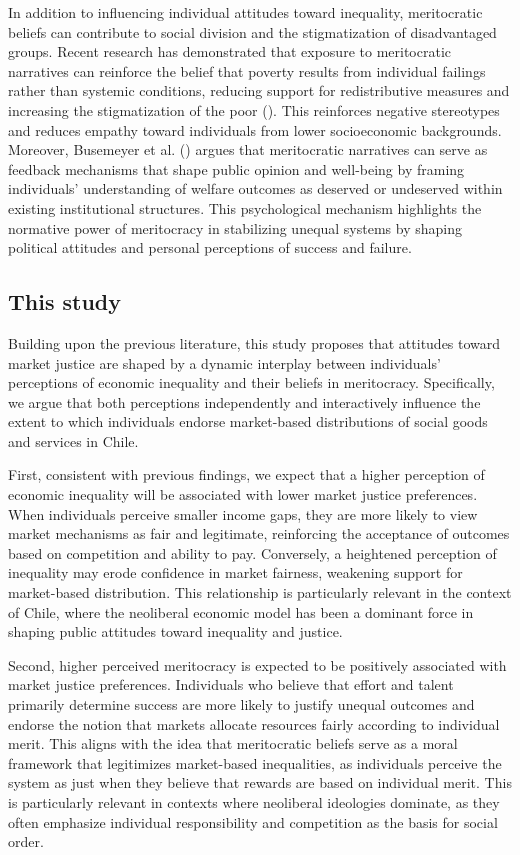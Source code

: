 \documentclass[
  12pt,
]{article}
\begin{document}
In addition to influencing individual attitudes toward inequality,
meritocratic beliefs can contribute to social division and the
stigmatization of disadvantaged groups. Recent research has demonstrated
that exposure to meritocratic narratives can reinforce the belief that
poverty results from individual failings rather than systemic
conditions, reducing support for redistributive measures and increasing
the stigmatization of the poor (). This reinforces negative stereotypes and reduces empathy
toward individuals from lower socioeconomic backgrounds. Moreover,
Busemeyer et al. () argues
that meritocratic narratives can serve as feedback mechanisms that shape
public opinion and well-being by framing individuals' understanding of
welfare outcomes as deserved or undeserved within existing institutional
structures. This psychological mechanism highlights the normative power
of meritocracy in stabilizing unequal systems by shaping political
attitudes and personal perceptions of success and failure.

\subsection{This study}\label{this-study}

Building upon the previous literature, this study proposes that
attitudes toward market justice are shaped by a dynamic interplay
between individuals' perceptions of economic inequality and their
beliefs in meritocracy. Specifically, we argue that both perceptions
independently and interactively influence the extent to which
individuals endorse market-based distributions of social goods and
services in Chile.

First, consistent with previous findings, we expect that a higher
perception of economic inequality will be associated with lower market
justice preferences. When individuals perceive smaller income gaps, they
are more likely to view market mechanisms as fair and legitimate,
reinforcing the acceptance of outcomes based on competition and ability
to pay. Conversely, a heightened perception of inequality may erode
confidence in market fairness, weakening support for market-based
distribution. This relationship is particularly relevant in the context
of Chile, where the neoliberal economic model has been a dominant force
in shaping public attitudes toward inequality and justice.

Second, higher perceived meritocracy is expected to be positively
associated with market justice preferences. Individuals who believe that
effort and talent primarily determine success are more likely to justify
unequal outcomes and endorse the notion that markets allocate resources
fairly according to individual merit. This aligns with the idea that
meritocratic beliefs serve as a moral framework that legitimizes
market-based inequalities, as individuals perceive the system as just
when they believe that rewards are based on individual merit. This is
particularly relevant in contexts where neoliberal ideologies dominate,
as they often emphasize individual responsibility and competition as the
basis for social order.
\end{document}
